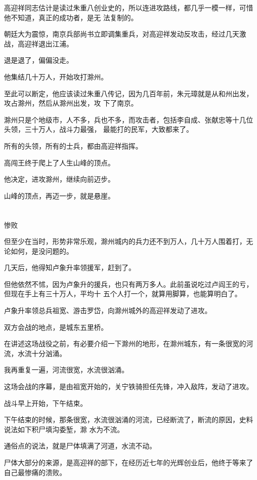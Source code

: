 \documentclass[11pt,a4paper,onecolumn]{article}
\begin{document}
高迎祥同志估计是读过朱重八创业史的，所以连进攻路线，都几乎一模一样，可惜他不知道，真正的成功者，是无
法复制的。

朝廷大为震惊，南京兵部尚书立即调集重兵，对高迎祥发动反攻击，经过几天激战，高迎祥退出江浦。

退是退了，偏偏没走。

他集结几十万人，开始攻打滁州。

至此可以断定，他应该读过朱重八传记，因为几百年前，朱元璋就是从和州出发，攻占滁州，然后从滁州出发，攻
下了南京。

滁州只是个地级市，人不多，兵也不多，而攻击者，包括李自成、张献忠等十几位头领，三十万人，战斗力最强，
最能打的民军，大致都来了。

所有的头领，所有的士兵，都由高迎祥指挥。

高闯王终于爬上了人生山峰的顶点。

他决定，进攻滁州，继续向前迈步。

山峰的顶点，再迈一步，就是悬崖。

\section[\thesection]{}

惨败

但至少在当时，形势非常乐观，滁州城内的兵力还不到万人，几十万人围着打，无论如何，是没问题的。

几天后，他得知卢象升率领援军，赶到了。

但他依然不怵，因为卢象升的援兵，也只有两万多人。此前虽说吃过卢阎王的亏，但现在手上有三十万人，平均十
五个人打一个，就算用脚算，也能算明白了。

卢象升率领总兵祖宽、游击罗岱，向滁州城外的高迎祥发动了进攻。

双方会战的地点，是城东五里桥。

在讲述这场战役之前，有必要介绍一下滁州的地形，在滁州城东，有一条很宽的河流，水流十分汹涌。

我再重复一遍，河流很宽，水流很汹涌。

这场会战的序幕，是由祖宽开始的，关宁铁骑担任先锋，冲入敌阵，发动了进攻。

战斗早上开始，下午结束。

下午结束的时候，那条很宽，水流很汹涌的河流，已经断流了，断流的原因，史料说法如下\myrule 积尸填沟委堑，滁
水为不流。

通俗点的说法，就是尸体填满了河道，水流不动。

尸体大部分的来源，是高迎祥的部下，在经历近七年的光辉创业后，他终于等来了自己最惨痛的溃败。
\end{document}
